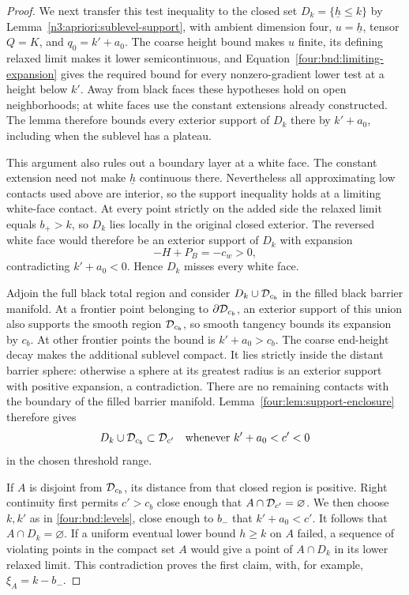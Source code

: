 \begin{proof}
We next transfer this test inequality to the closed set
$D_k=\{\underline h\le k\}$ by
Lemma~\ref{n3:apriori:sublevel-support}, with ambient dimension four,
$u=\underline h$, tensor $Q=K$, and $q_0=k'+a_0$.
The coarse height bound makes $u$ finite, its defining relaxed limit
makes it lower semicontinuous, and
Equation~\eqref{four:bnd:limiting-expansion} gives the required bound
for every nonzero-gradient lower test at a height below $k'$.
Away from black faces these hypotheses hold on open neighborhoods;
at white faces use the constant extensions already constructed.
The lemma therefore bounds every exterior support of $D_k$ there
by $k'+a_0$, including when the sublevel has a plateau.

This argument also rules out a boundary layer at a white face.  The
constant extension need not make $\underline h$ continuous there.
Nevertheless all approximating low contacts used above are interior,
so the support inequality holds at a limiting white-face contact.
At every point strictly on the added side the relaxed limit equals
$b_+>k$, so $D_k$ lies locally in the original closed exterior.
The reversed white face would therefore be an exterior support of
$D_k$ with expansion
\[
 -H+P_B=-c_w>0,
\]
contradicting $k'+a_0<0$.  Hence $D_k$ misses every white face.

Adjoin the full black total region and consider
$D_k\cup\mathcal D_{c_b}$ in the filled black barrier manifold.  At a
frontier point belonging to $\partial\mathcal D_{c_b}$, an exterior support
of this union also supports the smooth region $\mathcal D_{c_b}$, so smooth
tangency bounds its expansion by $c_b$.  At other frontier points
the bound is $k'+a_0>c_b$.  The coarse end-height decay makes the
additional sublevel compact.  It lies strictly inside the distant
barrier sphere: otherwise a sphere at its greatest radius is an
exterior support with positive expansion, a contradiction.  There
are no remaining contacts with the boundary of the filled barrier
manifold.  Lemma~\ref{four:lem:support-enclosure} therefore gives
\begin{equation}\label{four:bnd:sublevel-enclosure}
 D_k\cup\mathcal D_{c_b}\subset\mathcal D_{c'}
 \quad\hbox{whenever } k'+a_0<c'<0
\end{equation}
in the chosen threshold range.

If $A$ is disjoint from $\mathcal D_{c_b}$, its distance from that closed
region is positive.  Right continuity first permits $c'>c_b$ close
enough that $A\cap\mathcal D_{c'}=\varnothing$.  We then choose $k,k'$ as
in \eqref{four:bnd:levels}, close enough to $b_-$ that
$k'+a_0<c'$.  It follows that $A\cap D_k=\varnothing$.  If a uniform
eventual lower bound $h\ge k$ on $A$ failed, a sequence of violating
points in the compact set $A$ would give a point of $A\cap D_k$ in
its lower relaxed limit.  This contradiction proves the first claim,
with, for example, $\xi_A=k-b_-$.


\end{proof}
